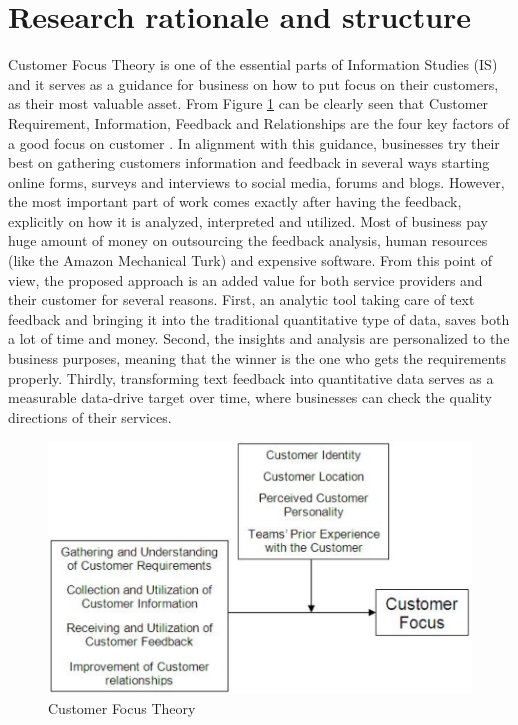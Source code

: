 \section{Research rationale and structure}
Customer Focus Theory is one of the essential parts of Information Studies (IS) and it serves as a guidance for business on how to put focus on their customers, as their most valuable asset. From Figure \ref{fig:cusfoc} can be clearly seen that Customer Requirement, Information, Feedback and Relationships are the four key factors of a good focus on customer \cite{lohan2011examining}. In alignment with this guidance, businesses try their best on gathering customers information and feedback in several ways starting online forms, surveys and interviews to social media, forums and blogs. However, the most important part of work comes exactly after having the feedback, explicitly on how it is analyzed, interpreted and utilized. Most of business pay huge amount of money on outsourcing the feedback analysis, human resources (like the Amazon Mechanical Turk) and expensive software. From this point of view, the proposed approach is an added value for both service providers and their customer for several reasons. First, an analytic tool taking care of text feedback and bringing it into the traditional quantitative type of data, saves both a lot of time and money. Second, the insights and analysis are personalized to the business purposes, meaning that the winner is the one who gets the requirements properly. Thirdly, transforming text feedback into quantitative data serves as a measurable data-drive target over time, where businesses can check the quality directions of their services.
\begin{figure}[h!]
	\centering
	\includegraphics[height=0.25\textheight]{fig01/CustomerFocus}
	\caption{Customer Focus Theory}
	\label{fig:cusfoc}
\end{figure}

